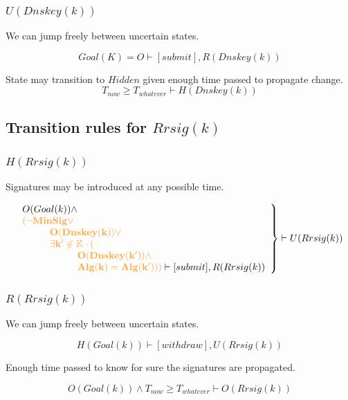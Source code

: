 \documentclass[twoside,english, a4paper]{article}
\newcommand{\highlightMinSig}[1]{\textcolor{MinSig}{\bf{#1}}}
\newcommand{\mathbox}[1]{#1}
\begin{document}
\subsubsection{$U(Dnskey(k))$}

\mathbox{

	We can jump freely between uncertain states.

	\begin{equation}
			Goal(K)=O \vdash [submit], R(Dnskey(k))
	\end{equation}

	State may transition to $Hidden$ given enough time passed to propagate 
	change. 
	\begin{equation}
			T_{now} \geq T_{whatever} \vdash H(Dnskey(k))
	\end{equation}
}

\subsection{Transition rules for $Rrsig(k)$}

\subsubsection{$H(Rrsig(k))$}

\mathbox{
	Signatures may be introduced at any possible time.

	\begin{equation}
		\left.
		\begin{array}{l}
			O(Goal(k)) \wedge \\
\highlightMinSig{			(\neg MinSig \vee }\\
\highlightMinSig{\hskip 1cm 	O(Dnskey(k)) \vee } \\
\highlightMinSig{\hskip 1cm 	\exists k' \not \in \mathbb{K} \cdot (}\\
\highlightMinSig{\hskip 2cm 	O(Dnskey(k')) \wedge }\\ 
\highlightMinSig{\hskip 2cm 	Alg(k) = Alg(k') ) ) }
\vdash [submit], R(Rrsig(k))
		\end{array}
		\right\} \vdash U(Rrsig(k))
	\end{equation}
}

\subsubsection{$R(Rrsig(k))$}

\mathbox{

	We can jump freely between uncertain states.
	
	\begin{equation}
		H(Goal(k)) \vdash [withdraw], U(Rrsig(k))
	\end{equation}

	Enough time passed to know for sure the signatures are propagated.
	
	\begin{equation}
		O(Goal(k)) \wedge T_{now} \geq T_{whatever} \vdash O(Rrsig(k))
	\end{equation}
}
\end{document}
